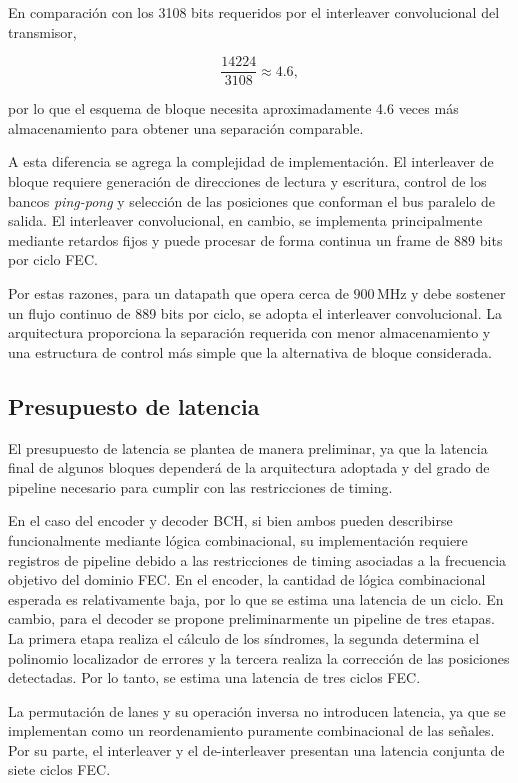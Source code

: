 \documentclass[10pt,a4paper]{article}
\begin{document}
En comparación con los 3108 bits requeridos por el interleaver convolucional
del transmisor,

\begin{equation}
    \frac{14224}{3108}
    \approx
    4.6,
\end{equation}

por lo que el esquema de bloque necesita aproximadamente 4.6 veces más
almacenamiento para obtener una separación comparable.

A esta diferencia se agrega la complejidad de implementación. El interleaver
de bloque requiere generación de direcciones de lectura y escritura, control
de los bancos \emph{ping-pong} y selección de las posiciones que conforman el
bus paralelo de salida. El interleaver convolucional, en cambio, se implementa
principalmente mediante retardos fijos y puede procesar de forma continua un
frame de 889 bits por ciclo FEC.

Por estas razones, para un datapath que opera cerca de $900\,\mathrm{MHz}$ y
debe sostener un flujo continuo de 889 bits por ciclo, se adopta el interleaver
convolucional. La arquitectura proporciona la separación requerida con menor
almacenamiento y una estructura de control más simple que la alternativa de
bloque considerada.

\subsection{Presupuesto de latencia}

El presupuesto de latencia se plantea de manera preliminar, ya que la latencia
final de algunos bloques dependerá de la arquitectura adoptada y del grado
de pipeline necesario para cumplir con las restricciones de timing.

En el caso del encoder y decoder BCH, si bien ambos pueden describirse
funcionalmente mediante lógica combinacional, su implementación requiere
registros de pipeline debido a las restricciones de timing asociadas a la
frecuencia objetivo del dominio FEC. En el encoder, la cantidad de lógica
combinacional esperada es relativamente baja, por lo que se estima una
latencia de un ciclo. En cambio, para el decoder se propone preliminarmente un
pipeline de tres etapas. La primera etapa realiza el cálculo de los síndromes,
la segunda determina el polinomio localizador de errores y la tercera realiza
la corrección de las posiciones detectadas. Por lo tanto, se estima una
latencia de tres ciclos FEC.

La permutación de lanes y su operación inversa no introducen latencia, ya que
se implementan como un reordenamiento puramente combinacional de las señales.
Por su parte, el interleaver y el de-interleaver presentan una latencia conjunta
de siete ciclos FEC.
\end{document}
